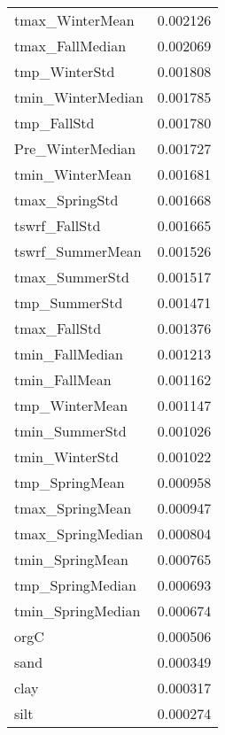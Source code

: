 \begin{tabular}{lr}
tmax_WinterMean & 0.002126 \\
tmax_FallMedian & 0.002069 \\
tmp_WinterStd & 0.001808 \\
tmin_WinterMedian & 0.001785 \\
tmp_FallStd & 0.001780 \\
Pre_WinterMedian & 0.001727 \\
tmin_WinterMean & 0.001681 \\
tmax_SpringStd & 0.001668 \\
tswrf_FallStd & 0.001665 \\
tswrf_SummerMean & 0.001526 \\
tmax_SummerStd & 0.001517 \\
tmp_SummerStd & 0.001471 \\
tmax_FallStd & 0.001376 \\
tmin_FallMedian & 0.001213 \\
tmin_FallMean & 0.001162 \\
tmp_WinterMean & 0.001147 \\
tmin_SummerStd & 0.001026 \\
tmin_WinterStd & 0.001022 \\
tmp_SpringMean & 0.000958 \\
tmax_SpringMean & 0.000947 \\
tmax_SpringMedian & 0.000804 \\
tmin_SpringMean & 0.000765 \\
tmp_SpringMedian & 0.000693 \\
tmin_SpringMedian & 0.000674 \\
orgC & 0.000506 \\
sand & 0.000349 \\
clay & 0.000317 \\
silt & 0.000274 \\
\bottomrule
\end{tabular}
